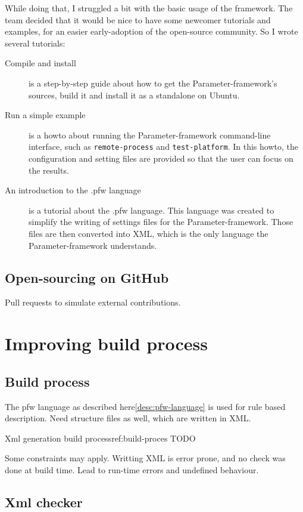 While doing that, I struggled a bit with the basic usage of the framework. The
team decided that it would be nice to have some newcomer tutorials and examples,
for an easier early-adoption of the open-source community. So I wrote several
tutorials:
\begin{description}
    \item[Compile and install]
        is a step-by-step guide about how to get the Parameter-framework's sources,
        build it and install it as a standalone on Ubuntu.
    \item[Run a simple example]
        is a howto about running the Parameter-framework command-line interface, such
        as \lstinline{remote-process} and \lstinline {test-platform}.
        In this howto, the configuration and setting files are provided so that
        the user can focus on the results.
    \item[An introduction to the .pfw language]\label{desc:pfw-language}
        is a tutorial about the .pfw language. This language was
        created to simplify the writing of settings files for the
        Parameter-framework. Those files are then converted into XML, which is
        the only language the Parameter-framework understands.
\end{description}

\subsection{Open-sourcing on GitHub}
Pull requests to simulate external contributions.

\section{Improving build process}
\subsection{Build process}
The pfw language as described here\ref{desc:pfw-language} is used for rule based
description. Need structure files as well, which are written in XML.

\begin{figureGraphics}{Xml generation build process}{ref:build-proces}
    TODO
\end{figureGraphics}

Some constraints may apply. Writting XML is error prone, and no check was done at
build time. Lead to run-time errors and undefined behaviour.
\subsection{Xml checker}
